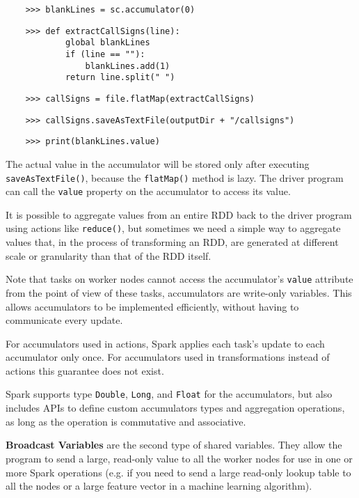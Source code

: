 \begin{lstlisting}
    >>> blankLines = sc.accumulator(0)
\end{lstlisting}

\begin{lstlisting}
    >>> def extractCallSigns(line):
            global blankLines
            if (line == ""):
                blankLines.add(1)
            return line.split(" ")
\end{lstlisting}

\begin{lstlisting}
    >>> callSigns = file.flatMap(extractCallSigns)
\end{lstlisting}

\begin{lstlisting}
    >>> callSigns.saveAsTextFile(outputDir + "/callsigns")
\end{lstlisting}

\begin{lstlisting}
    >>> print(blankLines.value)
\end{lstlisting}

The actual value in the accumulator will be stored only after executing \texttt{saveAsTextFile()}, because the \texttt{flatMap()} method is lazy. The driver program can call the \texttt{value} property on the accumulator to access its value.


It is possible to aggregate values from an entire RDD back to the driver program using actions like \texttt{reduce()}, but sometimes we need a simple way to aggregate values that, in the process of transforming an RDD, are generated at different scale or granularity than that of the RDD itself.

Note that tasks on worker nodes cannot access the accumulator's \texttt{value} attribute from the point of view of these tasks, accumulators are write-only variables. This allows accumulators to be implemented efficiently, without having to communicate every update.

For accumulators used in actions, Spark applies each task's update to each accumulator only once. For accumulators used in transformations instead of actions this guarantee does not exist.

Spark supports type \texttt{Double}, \texttt{Long}, and \texttt{Float} for the accumulators, but also includes APIs to define custom accumulators types and aggregation operations, as long as the operation is commutative and associative.


\textbf{Broadcast Variables} are the second type of shared variables. They allow the program to send a large, read-only value to all the worker nodes for use in one or more Spark operations (e.g. if you need to send a large read-only lookup table to all the nodes or a large feature vector in a machine learning algorithm).

